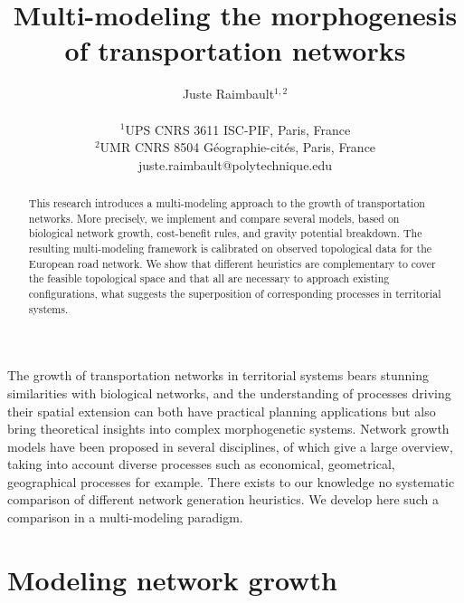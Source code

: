 \documentclass[letterpaper]{article}
\title{Multi-modeling the morphogenesis of transportation networks}
\author{Juste Raimbault$^{1,2}$\\
\mbox{}\\
$^1$UPS CNRS 3611 ISC-PIF, Paris, France \\
$^2$UMR CNRS 8504 G{\'e}ographie-cit{\'e}s, Paris, France \\
juste.raimbault@polytechnique.edu} %
\begin{document}
\maketitle

\begin{abstract}
This research introduces a multi-modeling approach to the growth of transportation networks. More precisely, we implement and compare several models, based on biological network growth, cost-benefit rules, and gravity potential breakdown. The resulting multi-modeling framework is calibrated on observed topological data for the European road network. We show that different heuristics are complementary to cover the feasible topological space and that all are necessary to approach existing configurations, what suggests the superposition of corresponding processes in territorial systems.
\end{abstract}



The growth of transportation networks in territorial systems bears stunning similarities with biological networks, and the understanding of processes driving their spatial extension can both have practical planning applications but also bring theoretical insights into complex morphogenetic systems. Network growth models have been proposed in several disciplines, of which \cite{xie2009modeling} give a large overview, taking into account diverse processes such as economical, geometrical, geographical processes for example. There exists to our knowledge no systematic comparison of different network generation heuristics. We develop here such a comparison in a multi-modeling paradigm.


\section{Modeling network growth}
\end{document}

